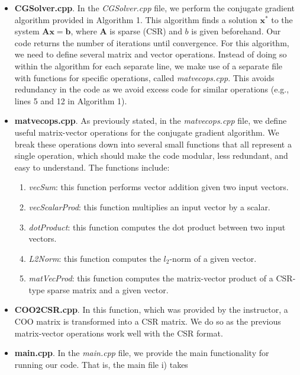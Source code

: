 \documentclass[12pt, a4paper]{article}
\begin{document}
\begin{itemize}
    \item \textbf{CGSolver.cpp}. In the \textit{CGSolver.cpp} file, we perform 
    the  conjugate gradient algorithm provided in Algorithm 1. 
    This algorithm finds a solution $\mathbf{x}^*$ to the system $\mathbf{A}
    \mathbf{x} = \mathbf{b}$, where $\mathbf{A}$ is 
    sparse (CSR) and $b$ is given beforehand. Our code returns the number 
    of iterations until convergence. For this algorithm, we need to define
    several matrix and vector operations. Instead of doing so within the
    algorithm for each separate line, we make use of a separate file
    with functions for specific operations, called \textit{matvecops.cpp}.
    This avoids redundancy in the code as we avoid excess code for similar
    operations (e.g., lines 5 and 12 in Algorithm 1).
    \item \textbf{matvecops.cpp}. As previously stated, in the 
    \textit{matvecops.cpp} file, we define useful
    matrix-vector operations for the conjugate gradient algorithm. 
    We break these operations down into several small functions that all 
    represent a single operation, which should make the code modular,
    less redundant, and easy to understand. The functions include:
        \begin{enumerate}
            \item \textit{vecSum}: this function performs vector addition 
            given two input vectors.
            \item \textit{vecScalarProd}: this function multiplies an input
            vector by a scalar.
            \item \textit{dotProduct}: this function computes the dot product
            between two input vectors.
            \item \textit{L2Norm}: this function computes the $l_2$-norm of
            a given vector.
            \item \textit{matVecProd}: this function computes the matrix-vector
            product of a CSR-type sparse matrix and a given vector.
        \end{enumerate}
    \item \textbf{COO2CSR.cpp}. In this function, which was provided by the 
    instructor, a COO matrix is transformed into a CSR matrix. We do so as
    the previous matrix-vector operations work well with the CSR format.
    \item \textbf{main.cpp}. In the \textit{main.cpp} file, we provide the 
    main functionality for running our code. That is, the main file i) takes 

\end{itemize}
\end{document}
